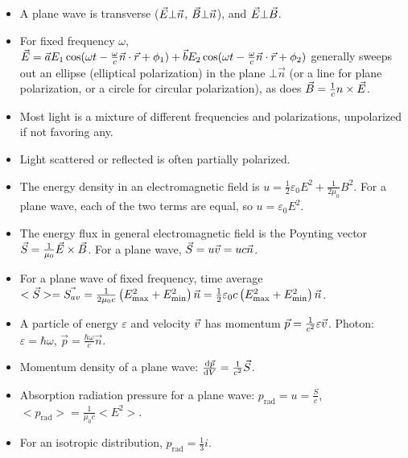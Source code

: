 \begin{itemize}
	\item A plane wave is transverse ($\vec{E} \bot \vec{n}$, $\vec{B} \bot \vec{n}$), and $\vec{E} \bot \vec{B}$.
	
	\item For fixed frequency $\omega$, $\vec{E} = \vec{a}E_1\cos(\omega t - \frac{\omega}{c}\vec{n}\cdot\vec{r}+\phi_1) + \vec{b}E_2\cos(\omega t - \frac{\omega}{c}\vec{n}\cdot\vec{r}+\phi_2)$ generally sweeps out an ellipse (elliptical polarization) in the plane $\bot \vec{n}$ (or a line for plane polarization, or a circle for circular polarization), as does $\vec{B} = \frac{1}{c}n\times\vec{E}$.
	
	\item Most light is a mixture of different frequencies and polarizations, unpolarized if not favoring any.
	
	\item Light scattered or reflected is often partially polarized.
	
	\item The energy density in an electromagnetic field is $u = \frac{1}{2}\varepsilon_0 E^2 + \frac{1}{2\mu_0}B^2$. For a plane wave, each of the two terms are equal, so $u = \varepsilon_0 E^2$.
	
	\item The energy flux in general electromagnetic field is the Poynting vector $\vec{S} = \frac{1}{\mu_0}\vec{E}\times\vec{B}$. For a plane wave, $\vec{S} = u\vec{v} = uc\vec{n}$.
	
	\item For a plane wave of fixed frequency, time average $<\vec{S}> = \vec{S_{av}} = \frac{1}{2\mu_0c}\left(  E_\text{max}^2 + E_\text{min}^2  \right)\vec{n} = \frac{1}{2}\varepsilon_0c\left(  E_\text{max}^2 + E_\text{min}^2  \right)\vec{n}$.
	
	\item A particle of energy $\varepsilon$ and velocity $\vec{v}$ has momentum $\vec{p} = \frac{1}{c^2}\varepsilon\vec{v}$. Photon: $\varepsilon = \hbar\omega$, $\vec{p} = \frac{\hbar\omega}{c}\vec{n}$.
	
	\item Momentum density of a plane wave: $\frac{\operatorname{d\!} \vec{p}}{\operatorname{d\!} V} = \frac{1}{c^2}\vec{S}$.
	
	\item Absorption radiation pressure for a plane wave: $p_\text{rad} = u = \frac{S}{c}$, $<p_\text{rad}> = \frac{1}{\mu_0 c} <E^2>$.
	
	\item For an isotropic distribution, $p_\text{rad} = \frac{1}{3}i$.
	

\end{itemize}
